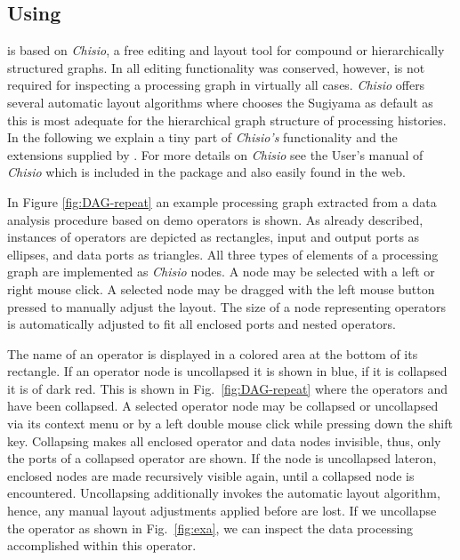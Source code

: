 \subsection{Using \mtbc}

\mtbc is based on
{\em Chisio}, a free editing and layout tool for compound or hierarchically
structured graphs. In \mtbc all editing functionality was conserved, however, is not
required for inspecting a processing graph in virtually all cases.
{\em Chisio} offers several automatic layout algorithms where \mtbc chooses
the Sugiyama as default as this is most adequate for the hierarchical graph structure
of processing histories.
In the following we explain a tiny part of {\em Chisio's} functionality and the
extensions supplied by \mtbc.
For more details on {\em Chisio} see the User's manual of {\em Chisio} which is
included in the \mtbc package and also easily found in the web.

In Figure \ref{fig:DAG-repeat} an example processing graph extracted from a data analysis procedure
based on demo operators is shown.
As already described, 
instances of operators are depicted as rectangles, input and output ports as ellipses, and data ports as triangles.
All three types of elements of a processing graph are implemented as
{\em Chisio} nodes. A node may be selected with a left  or right mouse click.
A selected node may be dragged with the left mouse button pressed to manually adjust the
layout.
The size of a node representing operators is automatically adjusted to fit all enclosed
ports and nested operators.

The name of an operator is displayed in a colored area at the bottom of its rectangle.
If an operator node is uncollapsed it is shown in blue, if it is collapsed it is
of dark red.
This is shown in Fig.~\ref{fig:DAG-repeat} 
where the operators   and 
have been collapsed.
A selected operator node may be collapsed or uncollapsed 
via its context menu or by a left double mouse click while pressing down the shift key.
Collapsing makes all enclosed operator and data nodes invisible, thus, only
the ports of a collapsed operator are shown.
If the node is uncollapsed lateron, enclosed nodes are made recursively visible
again, until a collapsed node is encountered.
Uncollapsing additionally invokes the automatic layout algorithm, hence, any manual
layout adjustments applied before are lost.
If we uncollapse the operator 
as shown in Fig.~\ref{fig:exa}, we can inspect the data processing 
accomplished within this operator.

